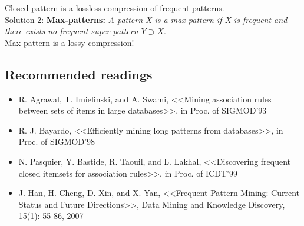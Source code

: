 Closed pattern is a lossless compression of frequent patterns.\\

Solution 2: \textbf{Max-patterns:} \textit{A pattern X is a max-pattern if X is frequent and there exists no frequent super-pattern $Y \supset X$}.\\

Max-pattern is a lossy compression!

\subsection{Recommended readings}
\begin{itemize}
\item R. Agrawal, T. Imielinski, and A. Swami, <<Mining association rules between sets of items in large databases>>, in Proc. of SIGMOD'93
\item R. J. Bayardo, <<Efficiently mining long patterns from databases>>, in Proc. of SIGMOD'98
\item N. Pasquier, Y. Bastide, R. Taouil, and L. Lakhal, <<Discovering frequent closed itemsets
for association rules>>, in Proc. of ICDT'99
\item J. Han, H. Cheng, D. Xin, and X. Yan, <<Frequent Pattern Mining: Current Status and Future Directions>>, Data Mining and Knowledge Discovery, 15(1): 55-86, 2007
\end{itemize}

